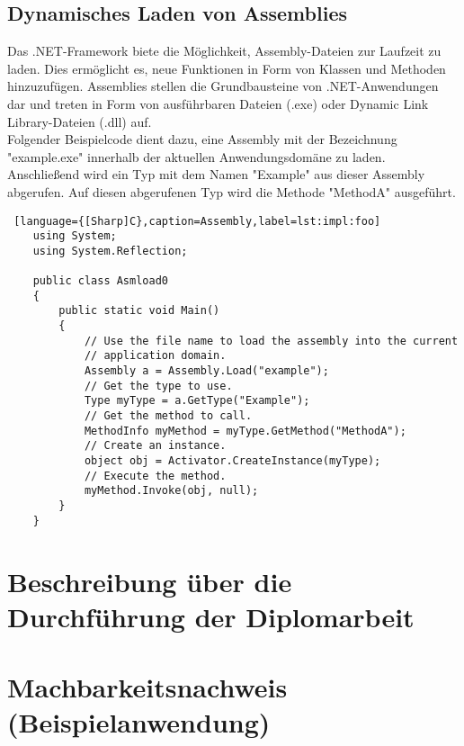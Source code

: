 \subsection*{Dynamisches Laden von Assemblies}

Das .NET-Framework biete die Möglichkeit, Assembly-Dateien zur Laufzeit zu laden. 
Dies ermöglicht es, neue Funktionen in Form von Klassen und Methoden hinzuzufügen. 
Assemblies stellen die Grundbausteine von .NET-Anwendungen dar und treten in Form 
von ausführbaren Dateien (.exe) oder Dynamic Link Library-Dateien (.dll) auf.\\

Folgender Beispielcode dient dazu, eine Assembly mit der Bezeichnung "example.exe" innerhalb 
der aktuellen Anwendungsdomäne zu laden. Anschließend wird ein Typ mit dem Namen "Example" 
aus dieser Assembly abgerufen. Auf diesen abgerufenen Typ wird die Methode "MethodA" ausgeführt.\\

\begin{lstlisting} [language={[Sharp]C},caption=Assembly,label=lst:impl:foo]
    using System;
    using System.Reflection;
    
    public class Asmload0
    {
        public static void Main()
        {
            // Use the file name to load the assembly into the current
            // application domain.
            Assembly a = Assembly.Load("example");
            // Get the type to use.
            Type myType = a.GetType("Example");
            // Get the method to call.
            MethodInfo myMethod = myType.GetMethod("MethodA");
            // Create an instance.
            object obj = Activator.CreateInstance(myType);
            // Execute the method.
            myMethod.Invoke(obj, null);
        }
    }
\end{lstlisting}

\newpage
\section{Beschreibung über die Durchführung der Diplomarbeit}



\newpage
\section{Machbarkeitsnachweis (Beispielanwendung)}
